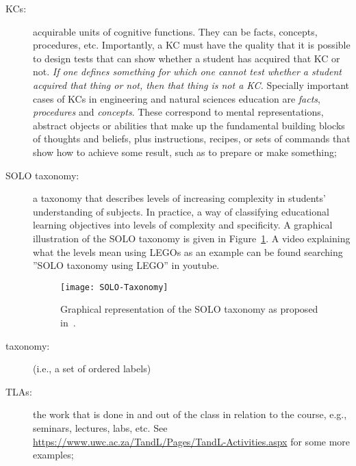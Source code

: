 \begin{description}
	\item[\acfp{KC}:] acquirable units of cognitive functions. They can
		be facts, concepts, procedures, etc. Importantly, a \ac{KC}
		must have the quality that it is possible to design tests
		that can show whether a student has acquired that \ac{KC} or
		not. \emph{If one defines something for which one cannot
		test whether a student acquired that thing or not, then that
		thing is not a \ac{KC}.} Specially important cases of
		\acp{KC} in engineering and natural sciences education are
		\emph{facts}, \emph{procedures} and \emph{concepts}. These
		correspond to mental representations, abstract objects or
		abilities that make up the fundamental building blocks of
		thoughts and beliefs, plus instructions, recipes, or sets of
		commands that show how to achieve some result, such as to
		prepare or make something;

	\item[\ac{SOLO} taxonomy:] a taxonomy that describes levels of
		increasing complexity in students' understanding of
		subjects. In practice, a way of classifying educational
		learning objectives into levels of complexity and
		specificity. A graphical illustration of the SOLO taxonomy
		is given in Figure~\ref{fig:SOLO-taxonomy}. A video
		explaining what the levels mean using LEGOs as an example
		can be found searching ''SOLO taxonomy using LEGO'' in
		youtube.

		\begin{figure}[!htbp]
			\centering
			\texttt{[image: SOLO-Taxonomy]}
			\caption{Graphical representation of the \ac{SOLO}
			taxonomy as proposed in~\cite{biggs1982evaluation}.}
			\label{fig:SOLO-taxonomy}
		\end{figure}

	\item[taxonomy:] (i.e., a set of ordered labels) 

	\item[\acfp{TLA}:] the work that is done in and out of the class in
		relation to the course, e.g., seminars, lectures, labs, etc.
		See
		\url{https://www.uwc.ac.za/TandL/Pages/TandL-Activities.aspx}
		for some more examples; 

\end{description} 

